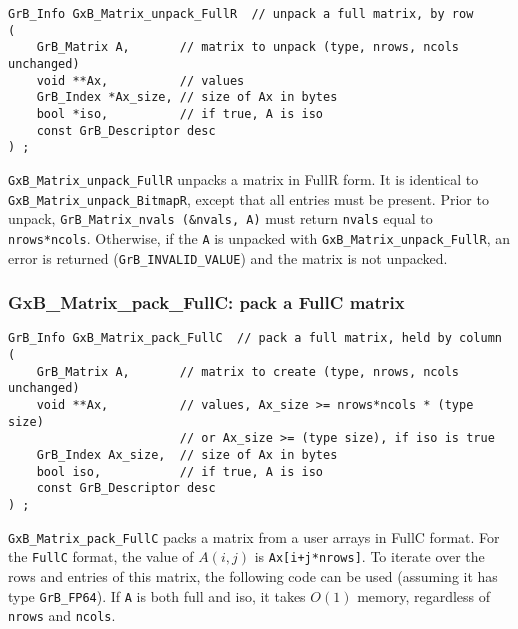 \documentclass[12pt]{article}
\begin{document}
\begin{mdframed}[userdefinedwidth=6in]
{\footnotesize
\begin{verbatim}
GrB_Info GxB_Matrix_unpack_FullR  // unpack a full matrix, by row
(
    GrB_Matrix A,       // matrix to unpack (type, nrows, ncols unchanged)
    void **Ax,          // values
    GrB_Index *Ax_size, // size of Ax in bytes
    bool *iso,          // if true, A is iso
    const GrB_Descriptor desc
) ;
\end{verbatim}
} \end{mdframed}

\verb'GxB_Matrix_unpack_FullR' unpacks a matrix in FullR form.  It is identical
to \verb'GxB_Matrix_unpack_BitmapR', except that all entries must be present.
Prior to unpack, \verb'GrB_Matrix_nvals (&nvals, A)' must return
\verb'nvals' equal to \verb'nrows*ncols'.  Otherwise, if the \verb'A' is
unpacked with \newline \verb'GxB_Matrix_unpack_FullR', an error is returned
(\verb'GrB_INVALID_VALUE') and the matrix is not unpacked.

\subsubsection{{\sf GxB\_Matrix\_pack\_FullC:} pack a FullC matrix}
\label{matrix_pack_fullc}

\begin{mdframed}[userdefinedwidth=6in]
{\footnotesize
\begin{verbatim}
GrB_Info GxB_Matrix_pack_FullC  // pack a full matrix, held by column
(
    GrB_Matrix A,       // matrix to create (type, nrows, ncols unchanged)
    void **Ax,          // values, Ax_size >= nrows*ncols * (type size)
                        // or Ax_size >= (type size), if iso is true
    GrB_Index Ax_size,  // size of Ax in bytes
    bool iso,           // if true, A is iso
    const GrB_Descriptor desc
) ;
\end{verbatim}
} \end{mdframed}

\verb'GxB_Matrix_pack_FullC' packs a matrix from a user arrays in FullC
format.  For the \verb'FullC' format,
the value of $A(i,j)$ is \verb'Ax[i+j*nrows]'.
To iterate over the rows and entries of this matrix, the following code can be
used (assuming it has type \verb'GrB_FP64').
If \verb'A' is both full and iso, it takes $O(1)$ memory,
regardless of \verb'nrows' and \verb'ncols'.
\end{document}
